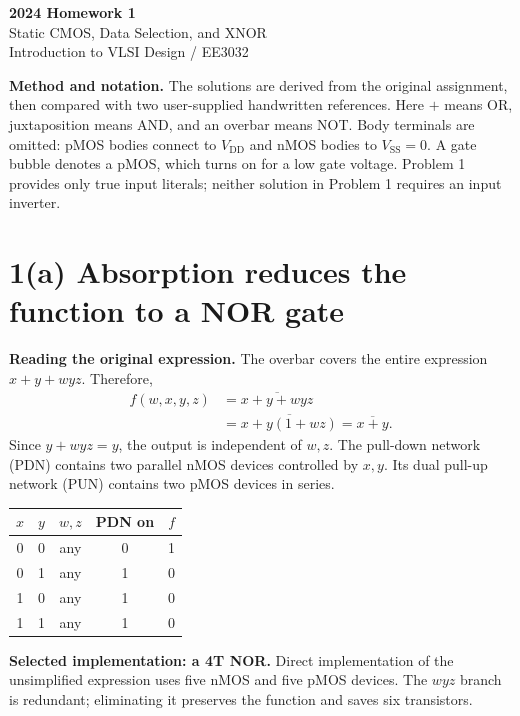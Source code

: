 \documentclass[11pt,a4paper]{article}
\newcommand{\answer}[1]{\par\noindent\colorbox{accent!9}{\parbox{0.96\linewidth}{#1}}\par}
\newcommand{\VDD}{V_{\mathrm{DD}}}
\newcommand{\VSS}{V_{\mathrm{SS}}}
\newcommand{\MOS}[5]{
  \coordinate (#1) at (#2,#3);
  \coordinate (#1t) at ($(#1)+(0,.55)$);
  \coordinate (#1b) at ($(#1)+(0,-.55)$);
  \draw (#1t)--($(#1)+(0,.30)$)--($(#1)+(-.18,.30)$);
  \draw ($(#1)+(-.18,.34)$)--($(#1)+(-.18,-.34)$);
  \draw ($(#1)+(-.18,-.30)$)--($(#1)+(0,-.30)$)--(#1b);
  \draw ($(#1)+(-.35,.33)$)--($(#1)+(-.35,-.33)$);
  \def\type{#5}\def\ptype{p}
  \ifx\type\ptype
    \draw ($(#1)+(-.78,0)$)--($(#1)+(-.53,0)$);
    \draw ($(#1)+(-.465,0)$) circle (.065);
    \draw ($(#1)+(-.40,0)$)--($(#1)+(-.35,0)$);
  \else
    \draw ($(#1)+(-.78,0)$)--($(#1)+(-.35,0)$);
  \fi
  \node[anchor=east] at ($(#1)+(-.82,0)$) {$#4$};
  \node[anchor=west,font=\scriptsize] at ($(#1)+(.10,0)$) {#1};
}
\begin{document}
\begin{center}
{\LARGE\bfseries 2024 Homework 1}\\[4pt]
{\large Static CMOS, Data Selection, and XNOR}\\[4pt]
{\small Introduction to VLSI Design / EE3032}
\end{center}
\textbf{Method and notation.} The solutions are derived from the original assignment,
then compared with two user-supplied handwritten references. Here $+$ means OR,
juxtaposition means AND, and an overbar means NOT. Body terminals are omitted:
pMOS bodies connect to $\VDD$ and nMOS bodies to $\VSS=0$. A gate bubble denotes
a pMOS, which turns on for a low gate voltage. Problem 1 provides only true input
literals; neither solution in Problem 1 requires an input inverter.

\section*{1(a) Absorption reduces the function to a NOR gate}
\textbf{Reading the original expression.} The overbar covers the entire expression
$x+y+w y z$. Therefore,
\begin{align*}
 f(w,x,y,z)&=\overline{x+y+w y z}\\
 &=\overline{x+y(1+wz)}=\boxed{\overline{x+y}}.
\end{align*}
Since $y+w y z=y$, the output is independent of $w,z$. The pull-down network
(PDN) contains two parallel nMOS devices controlled by $x,y$. Its dual pull-up
network (PUN) contains two pMOS devices in series.
\begin{center}
\end{center}
\begin{center}
\begin{tabular}{ccccc}\toprule
$x$&$y$&$w,z$&PDN on&$f$\\\midrule
0&0&any&0&1\\0&1&any&1&0\\1&0&any&1&0\\1&1&any&1&0\\\bottomrule
\end{tabular}
\end{center}
\answer{\textbf{Selected implementation: a 4T NOR.} Direct implementation of the
unsimplified expression uses five nMOS and five pMOS devices. The $wyz$ branch
is redundant; eliminating it preserves the function and saves six transistors.}
\end{document}
